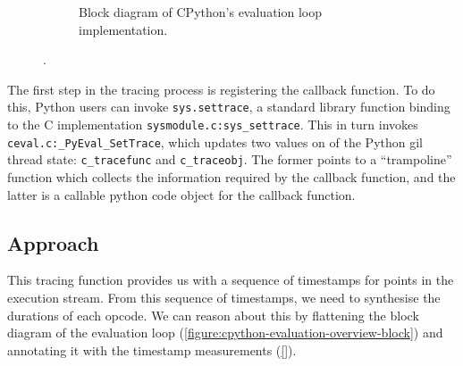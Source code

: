 \begin{figure}[H]
\begin{subfigure}[b]{0.3\textwidth}
       \caption{Block diagram of CPython's evaluation loop implementation.}
       \label{figure:cpython-evaluation-overview-block}
    \end{subfigure}
    \vspace{1em}
    \captionsetup{name=Listing}
    \caption{.}
    \label{figure:cpython-evaluation-overview}
\end{figure}


The first step in the tracing process is registering the callback function.
To do this, Python users can invoke \texttt{sys.settrace}, a standard library function binding to the C implementation \texttt{sysmodule.c:sys\_settrace}. This in turn invokes \texttt{ceval.c:\_PyEval\_SetTrace}, which updates two values on of the Python \ac{gil} thread state: \texttt{c\_tracefunc} and \texttt{c\_traceobj}. The former points to a ``trampoline'' function which collects the information required by the callback function, and the latter is a callable python code object for the callback function.


\subsection{Approach}
\label{ssec:profiling-bytecode-approach}



This tracing function provides us with a sequence of timestamps for points in the execution stream.
From this sequence of timestamps, we need to synthesise the durations of each opcode.
We can reason about this by flattening the block diagram of the evaluation loop (\autoref{figure:cpython-evaluation-overview-block}) and annotating it with the timestamp measurements (\autoref{}).





